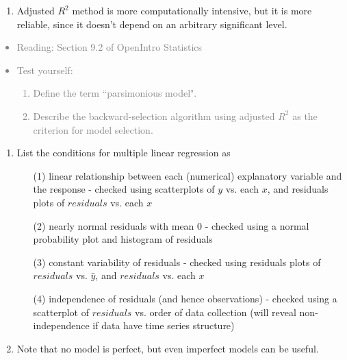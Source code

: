 \documentclass[11pt]{article}
\newcommand{\gray}[1]{\textcolor{gray}{#1}}
\begin{document}
\begin{enumerate}[resume]
\item Adjusted $R^2$ method is more computationally intensive, but it is more reliable, since it doesn't depend on an arbitrary significant level.

\end{enumerate}

\gray{
{\it
\vspace{-0.55cm}
\begin{itemize}
\renewcommand{\labelitemi}{{\textcolor{dark}{$\ast$}}}
\item Reading: Section 9.2 of OpenIntro Statistics
\item Test yourself:
\begin{enumerate}
\item Define the term ``parsimonious model".
\item Describe the backward-selection algorithm using adjusted $R^2$ as the criterion for model selection.
\end{enumerate}
\end{itemize}
}}

%

\vspace{0.48cm}

%
\begin{enumerate}[resume]
\renewcommand\labelenumi{\textcolor{light}{\textbf{LO \theenumi.}}}

\item List the conditions for multiple linear regression as
\begin{enumerate}
\item[(1)] linear relationship between each (numerical) explanatory variable and the response - checked using scatterplots of $y$ vs. each $x$, and residuals plots of $residuals$ vs. each $x$
\item[(2)] nearly normal residuals with mean 0 - checked using a normal probability plot and histogram of residuals
\item[(3)] constant variability of residuals - checked using residuals plots of $residuals$ vs. $\hat{y}$, and $residuals$ vs. each $x$
\item[(4)] independence of residuals (and hence observations) - checked using a scatterplot of $residuals$ vs. order of data collection (will reveal non-independence if data have time series structure)
\end{enumerate}

\item Note that no model is perfect, but even imperfect models can be useful.

\end{enumerate}
\end{document}

